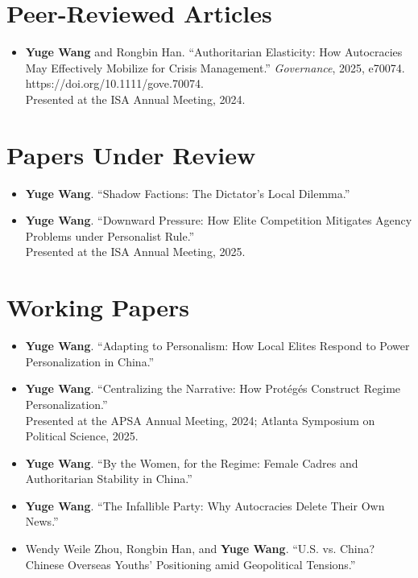 \documentclass[11pt]{article}
\begin{document}
	\section*{Peer-Reviewed Articles}
	\begin{itemize}
		\item \textbf{Yuge Wang} and Rongbin Han. “Authoritarian Elasticity: How Autocracies May Effectively Mobilize for Crisis Management.” \emph{Governance}, 2025, e70074. https://doi.org/10.1111/gove.70074.\\
		Presented at the ISA Annual Meeting, 2024.
	\end{itemize}
	
	
	\section*{Papers Under Review}
	\begin{itemize}
		\item \textbf{Yuge Wang}. ``Shadow Factions: The Dictator's Local Dilemma.'' \\
		\item \textbf{Yuge Wang}. ``Downward Pressure: How Elite Competition Mitigates Agency Problems under Personalist Rule.''\\
		Presented at the ISA Annual Meeting, 2025.
	\end{itemize}
	
	\section*{Working Papers}
	\begin{itemize}
		\item \textbf{Yuge Wang}. ``Adapting to Personalism: How Local Elites Respond to Power Personalization in China.''\\
		\item \textbf{Yuge Wang}. ``Centralizing the Narrative: How Protégés Construct Regime Personalization.''\\
		Presented at the APSA Annual Meeting, 2024; Atlanta Symposium on Political Science, 2025.
		\item \textbf{Yuge Wang}. ``By the Women, for the Regime: Female Cadres and Authoritarian Stability in China.''
		\item \textbf{Yuge Wang}. ``The Infallible Party: Why Autocracies Delete Their Own News.''
		\item Wendy Weile Zhou, Rongbin Han, and \textbf{Yuge Wang}. ``U.S. vs. China? Chinese Overseas Youths' Positioning amid Geopolitical Tensions.''
	\end{itemize}
	
\end{document}
